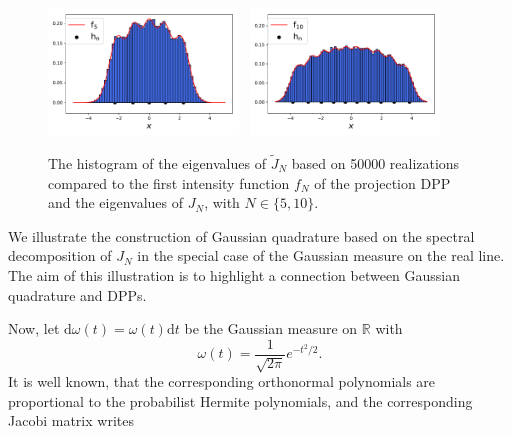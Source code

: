 \documentclass[twoside,11pt]{book}
\numberwithin{theorem}{chapter}
\numberwithin{definition}{chapter}
\numberwithin{proposition}{chapter}
\numberwithin{corollary}{chapter}
\numberwithin{example}{chapter}
\numberwithin{lemma}{chapter}
\numberwithin{assumption}{chapter}
\numberwithin{equation}{chapter}
\numberwithin{figure}{chapter}
\begin{document}
\begin{figure}[]
    \centering
\includegraphics[width= 0.45\textwidth]{img/neurips/Hermite/HermiteOP_kernel_diagonal_N_5_vs_50000_empirical}~
\includegraphics[width= 0.45\textwidth]{img/neurips/Hermite/HermiteOP_kernel_diagonal_N_10_vs_50000_empirical}
\caption{The histogram of the eigenvalues of $\tilde{J}_{N}$ based on 50000 realizations compared to the first intensity function $f_{N}$ of the projection DPP and the eigenvalues of $J_{N}$, with $N \in\{5,10\}$.   \label{fig:unidimHermiteEnsembleChristoffel}}
\end{figure}

We illustrate the construction of Gaussian quadrature based on the spectral decomposition of $J_N$ in the special case of the Gaussian measure on the real line. The aim of this illustration is to highlight a connection between Gaussian quadrature and DPPs.

Now, let $\mathrm{d}\omega(t) = \omega(t) \mathrm{d}t$ be the Gaussian measure on $\mathbb{R}$ with
\begin{equation}
\omega(t) = \frac{1}{\sqrt{2\pi}} e^{-t^{2}/2}.
\end{equation}
It is well known, that the corresponding orthonormal polynomials are proportional to the probabilist Hermite polynomials, and the corresponding Jacobi matrix writes
\end{document}
